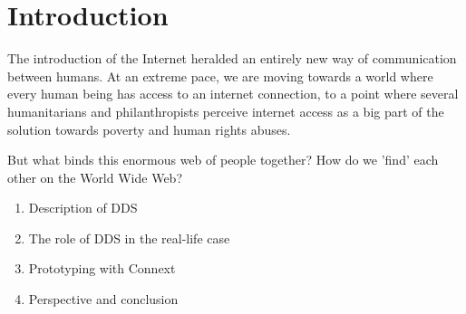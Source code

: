 \chapter{Introduction}
The introduction of the Internet heralded an entirely new way of communication between humans. At an extreme pace, we are moving towards a world where every human being has access to an internet connection, to a point where several humanitarians and philanthropists perceive internet access as a big part of the solution towards poverty and human rights abuses.

But what binds this enormous web of people together? How do we 'find' each other on the World Wide Web?

\begin{enumerate}
\item Description of DDS
\item The role of DDS in the real-life case
\item Prototyping with Connext
\item Perspective and conclusion
\end{enumerate}

